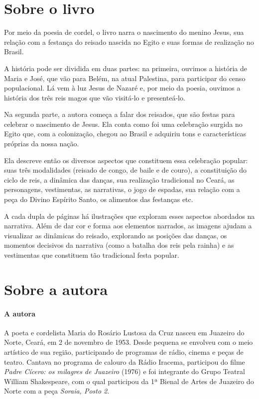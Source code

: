 \documentclass[11pt]{extarticle}
\begin{document}
\section{Sobre o livro}
Por meio da poesia de cordel, o livro narra o nascimento do menino Jesus, sua relação com a festança do reisado nascida no Egito e suas formas de realização no Brasil.

A história pode ser dividida em duas partes: na primeira, ouvimos a história de Maria e José, que vão para Belém, na atual Palestina, para participar do censo populacional. Lá vem à luz Jesus de Nazaré e, por meio da poesia, ouvimos a história dos três reis magos que vão visitá-lo e presenteá-lo.

Na segunda parte, a autora começa a falar dos reisados, que são festas para celebrar o nascimento de Jesus. Ela conta como foi uma celebração surgida no Egito que, com a colonização, chegou ao Brasil e adquiriu tons e características próprias da nossa nação.

Ela descreve então os diversos aspectos que constituem essa celebração popular: suas três modalidades (reisado de congo, de baile e de couro), a constituição do ciclo de reis, a dinâmica das danças, sua realização tradicional no Ceará, as personagens, vestimentas, as narrativas, o jogo de espadas, sua relação com a peça do Divino Espírito Santo, os alimentos das festanças etc.

A cada dupla de páginas há ilustrações que exploram esses aspectos abordados na narrativa. Além de dar cor e forma aos elementos narrados, as imagens ajudam a visualizar as dinâmicas do reisado, explorando as posições das danças, os momentos decisivos da narrativa (como a batalha dos reis pela rainha) e as vestimentas que constituem tão tradicional festa popular.


\section{Sobre a autora}


\paragraph{A autora}
A poeta e cordelista Maria do Rosário Lustosa da Cruz nasceu em Juazeiro do Norte, Ceará, em 2 de novembro de 1953. Desde pequena se envolveu com o meio artístico de sua região, participando de programas de rádio, cinema e peças de teatro. Cantava no programa de calouro da Rádio Iracema, participou do filme \textit{Padre Cícero: os milagres de Juazeiro} (1976) e foi integrante do Grupo Teatral William Shakespeare, com o qual participou da 1ª Bienal de Artes de Juazeiro do Norte com a peça \textit{Soraia, Posto 2}.
\end{document}
